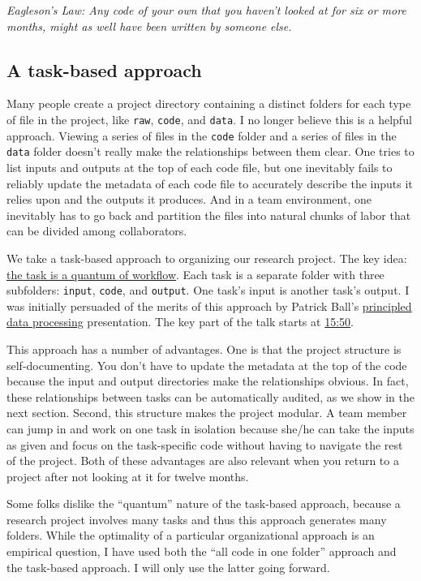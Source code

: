 \noindent \textit{Eagleson's Law: Any code of your own that you haven't looked at for six or more months, might as well have been written by someone else.}

\subsection{A task-based approach}

Many people create a project directory containing a distinct folders for each type of file in the project, like \texttt{raw}, \texttt{code}, and \texttt{data}.
I no longer believe this is a helpful approach.
Viewing a series of files in the \texttt{code} folder and a series of files in the \texttt{data} folder doesn't really make the relationships between them clear.
One tries to list inputs and outputs at the top of each code file,
but one inevitably fails to reliably update the metadata of each code file to accurately describe the inputs it relies upon and the outputs it produces.
And in a team environment, one inevitably has to go back and partition the files into natural chunks of labor that can be divided among collaborators.

We take a task-based approach to organizing our research project.
The key idea: \href{https://hrdag.org/2016/06/14/the-task-is-a-quantum-of-workflow/}{the task is a quantum of workflow}.
Each task is a separate folder with three subfolders: \texttt{input}, \texttt{code}, and \texttt{output}.
One task's input is another task's output.
I was initially persuaded of the merits of this approach by Patrick Ball's \href{https://www.youtube.com/watch?v=ZSunU9GQdcI}{principled data processing} presentation.
The key part of the talk starts at \href{https://youtu.be/ZSunU9GQdcI?t=15m50s}{15:50}.

This approach has a number of advantages.
One is that the project structure is self-documenting.
You don't have to update the metadata at the top of the code because the input and output directories make the relationships obvious.
In fact, these relationships between tasks can be automatically audited,
as we show in the next section.
Second, this structure makes the project modular.
A team member can jump in and work on one task in isolation because she/he can take the inputs as given and focus on the task-specific code without having to navigate the rest of the project.
Both of these advantages are also relevant when you return to a project after not looking at it for twelve months.

Some folks dislike the ``quantum'' nature of the task-based approach,
because a research project involves many tasks and thus this approach generates many folders.
While the optimality of a particular organizational approach is an empirical question,
I have used both the ``all code in one folder'' approach and the task-based approach.
I will only use the latter going forward.

